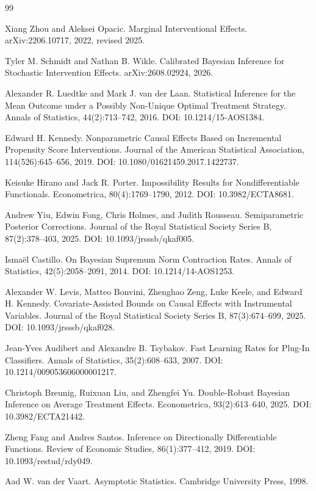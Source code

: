 \documentclass{article}
\begin{document}
\begin{thebibliography}{99}

   Xiang Zhou and Aleksei Opacic. Marginal Interventional Effects. arXiv:2206.10717, 2022, revised 2025.

   Tyler M. Schmidt and Nathan B. Wikle. Calibrated Bayesian Inference for Stochastic Intervention Effects. arXiv:2608.02924, 2026.

   Alexander R. Luedtke and Mark J. van der Laan. Statistical Inference for the Mean Outcome under a Possibly Non-Unique Optimal Treatment Strategy. Annals of Statistics, 44(2):713--742, 2016. DOI: 10.1214/15-AOS1384.

   Edward H. Kennedy. Nonparametric Causal Effects Based on Incremental Propensity Score Interventions. Journal of the American Statistical Association, 114(526):645--656, 2019. DOI: 10.1080/01621459.2017.1422737.

   Keisuke Hirano and Jack R. Porter. Impossibility Results for Nondifferentiable Functionals. Econometrica, 80(4):1769--1790, 2012. DOI: 10.3982/ECTA8681.

   Andrew Yiu, Edwin Fong, Chris Holmes, and Judith Rousseau. Semiparametric Posterior Corrections. Journal of the Royal Statistical Society Series B, 87(2):378--403, 2025. DOI: 10.1093/jrsssb/qkaf005.

   Ismaël Castillo. On Bayesian Supremum Norm Contraction Rates. Annals of Statistics, 42(5):2058--2091, 2014. DOI: 10.1214/14-AOS1253.

   Alexander W. Levis, Matteo Bonvini, Zhenghao Zeng, Luke Keele, and Edward H. Kennedy. Covariate-Assisted Bounds on Causal Effects with Instrumental Variables. Journal of the Royal Statistical Society Series B, 87(3):674--699, 2025. DOI: 10.1093/jrsssb/qkaf028.

   Jean-Yves Audibert and Alexandre B. Tsybakov. Fast Learning Rates for Plug-In Classifiers. Annals of Statistics, 35(2):608--633, 2007. DOI: 10.1214/009053606000001217.

   Christoph Breunig, Ruixuan Liu, and Zhengfei Yu. Double-Robust Bayesian Inference on Average Treatment Effects. Econometrica, 93(2):613--640, 2025. DOI: 10.3982/ECTA21442.

   Zheng Fang and Andres Santos. Inference on Directionally Differentiable Functions. Review of Economic Studies, 86(1):377--412, 2019. DOI: 10.1093/restud/rdy049.

   Aad W. van der Vaart. Asymptotic Statistics. Cambridge University Press, 1998.

\end{thebibliography}
\end{document}
